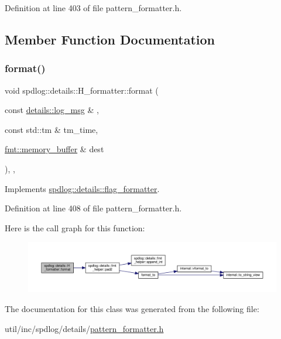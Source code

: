 Definition at line 403 of file pattern\+\_\+formatter.\+h.



\subsection{Member Function Documentation}
\mbox{\label{classspdlog_1_1details_1_1_h__formatter_a46e166ed26e90bfe5bbc6b5f83040bef}} 
\subsubsection{\texorpdfstring{format()}{format()}}
{\footnotesize\ttfamily void spdlog\+::details\+::\+H\+\_\+formatter\+::format (\begin{DoxyParamCaption}\item[{const \hyperlink{structspdlog_1_1details_1_1log__msg}{details\+::log\+\_\+msg} \&}]{,  }\item[{const std\+::tm \&}]{tm\+\_\+time,  }\item[{\hyperlink{format_8h_a21cbf729f69302f578e6db21c5e9e0d2}{fmt\+::memory\+\_\+buffer} \&}]{dest }\end{DoxyParamCaption})\hspace{0.3cm}{\ttfamily [inline]}, {\ttfamily [override]}, {\ttfamily [virtual]}}



Implements \hyperlink{classspdlog_1_1details_1_1flag__formatter_a33fb3e42a4c8200cceb833d92b53fb67}{spdlog\+::details\+::flag\+\_\+formatter}.



Definition at line 408 of file pattern\+\_\+formatter.\+h.

Here is the call graph for this function\+:
\nopagebreak
\begin{figure}[H]
\begin{center}
\leavevmode
\includegraphics[width=350pt]{classspdlog_1_1details_1_1_h__formatter_a46e166ed26e90bfe5bbc6b5f83040bef_cgraph}
\end{center}
\end{figure}


The documentation for this class was generated from the following file\+:\begin{DoxyCompactItemize}
\item 
util/inc/spdlog/details/\hyperlink{pattern__formatter_8h}{pattern\+\_\+formatter.\+h}\end{DoxyCompactItemize}
